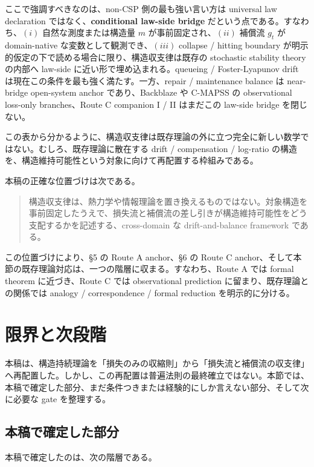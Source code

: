\documentclass[12pt,a4paper]{article}
\begin{document}
ここで強調すべきなのは、non-CSP 側の最も強い言い方は universal law declaration ではなく、\textbf{conditional law-side bridge} だという点である。すなわち、\((i)\) 自然な測度または構造量 \(m\) が事前固定され、\((ii)\) 補償流 \(g_{t}\) が domain-native な変数として観測でき、\((iii)\) collapse / hitting boundary が明示的仮定の下で読める場合に限り、構造収支律は既存の stochastic stability theory の内部へ law-side に近い形で埋め込まれる。queueing / Foster-Lyapunov drift は現在この条件を最も強く満たす。一方、repair / maintenance balance は near-bridge open-system anchor であり、Backblaze や C-MAPSS の observational loss-only branches、Route C companion I / II はまだこの law-side bridge を閉じない。

この表から分かるように、構造収支律は既存理論の外に立つ完全に新しい数学ではない。むしろ、既存理論に散在する drift / compensation / log-ratio の構造を、構造維持可能性という対象に向けて再配置する枠組みである。

本稿の正確な位置づけは次である。

\begin{quote}
構造収支律は、熱力学や情報理論を置き換えるものではない。対象構造を事前固定したうえで、損失流と補償流の差し引きが構造維持可能性をどう支配するかを記述する、cross-domain な drift-and-balance framework である。
\end{quote}

この位置づけにより、§5 の Route A anchor、§6 の Route C anchor、そして本節の既存理論対応は、一つの階層に収まる。すなわち、Route A では formal theorem に近づき、Route C では observational prediction に留まり、既存理論との関係では analogy / correspondence / formal reduction を明示的に分ける。

\section{限界と次段階}\label{ux9650ux754cux3068ux6b21ux6bb5ux968e}

本稿は、構造持続理論を「損失のみの収縮則」から「損失流と補償流の収支律」へ再配置した。しかし、この再配置は普遍法則の最終確立ではない。本節では、本稿で確定した部分、まだ条件つきまたは経験的にしか言えない部分、そして次に必要な gate を整理する。

\subsection{本稿で確定した部分}\label{ux672cux7a3fux3067ux78baux5b9aux3057ux305fux90e8ux5206}

本稿で確定したのは、次の階層である。
\end{document}
